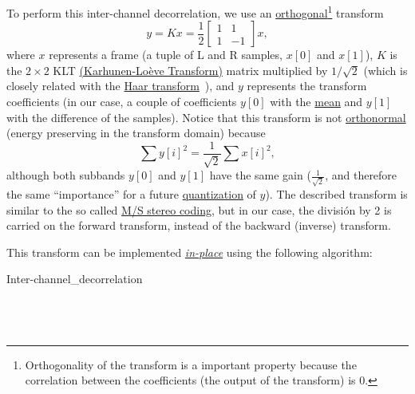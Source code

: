 To perform this inter-channel decorrelation, we use an
\href{https://en.wikipedia.org/wiki/Orthogonal_transformation}{orthogonal}\footnote{Orthogonality
  of the transform is a important property because the correlation
  between the coefficients (the output of the transform) is 0.}
transform
\begin{equation}
  y = Kx = \frac{1}{2}\begin{bmatrix} 1 & 1 \\ 1 & -1 \end{bmatrix}x,
\end{equation}
where $x$ represents a frame (a tuple of L and R samples, $x[0]$ and
$x[1]$), $K$ is the $2\times 2$ KLT
\href{http://fourier.eng.hmc.edu/e161/lectures/klt/node3.html}{(Karhunen-Lo\`eve
  Transform)} matrix multiplied by $1/\sqrt{2}$ (which is closely
related with the \href{http://wavelets.pybytes.com/wavelet/haar/}{Haar
  transform}~\cite{vetterli1995wavelets}), and $y$ represents the
transform coefficients (in our case, a couple of coefficients $y[0]$
with the \href{https://en.wikipedia.org/wiki/Arithmetic_mean}{mean}
and $y[1]$ with the difference of the samples). Notice that this
transform is not
\href{https://en.wikipedia.org/wiki/Orthonormal_basis}{orthonormal}
(energy preserving in the transform domain) because
\begin{equation}
  \sum y[i]^2 = \frac{1}{\sqrt{2}}\sum x[i]^2,
\end{equation}
although both subbands $y[0]$ and $y[1]$ have the same gain
($\frac{1}{\sqrt{2}}$, and therefore the same ``importance'' for a
future
\href{https://en.wikipedia.org/wiki/Quantization_(signal_processing)}{quantization}
of $y$). The described transform is similar to the so called
\href{https://en.wikipedia.org/wiki/Joint_encoding#M/S_stereo_coding}{M/S
  stereo coding}, but in our case, the división by 2 is carried on
the forward transform, instead of the backward (inverse) transform.

This transform can be implemented
\href{https://en.wikipedia.org/wiki/In-place_algorithm}{\emph{in-place}}
using the following algorithm:

\begin{pseudocode}{Inter-channel\_decorrelation}{~}
  \BEGIN
     \\
     \\
  \END
  \ENDPROCEDURE
  \BEGIN
     \\
     \\
  \END
  \ENDPROCEDURE
\end{pseudocode}

